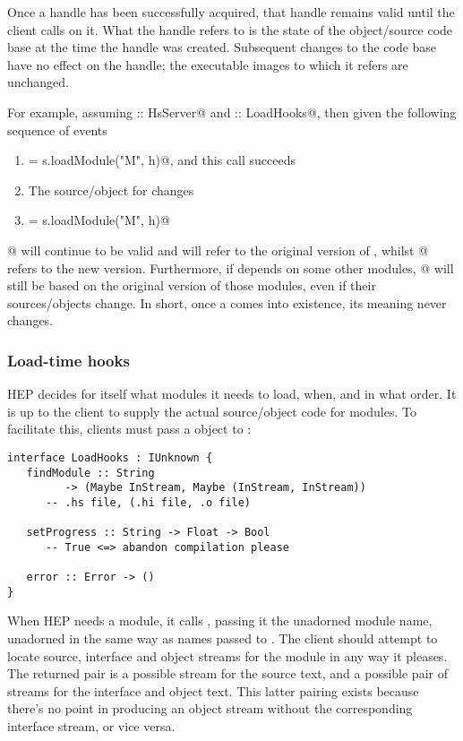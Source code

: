 Once a \verb@HsModule@ handle has been successfully acquired,
that handle remains valid until the client calls \verb@release@
on it.  What the handle refers to is the state of the object/source
code base at the time the handle was created.  Subsequent changes
to the code base have no effect on the handle; the executable images
to which it refers are unchanged.

For example, assuming \verb@s :: HsServer@ and \verb@h :: LoadHooks@,
then given the following sequence of events
\begin{enumerate}
\item {} = s.loadModule("M", h)@, and this call succeeds
\item The source/object for \verb@M@ changes
\item {} = s.loadModule("M", h)@
\end{enumerate}
@ will continue to be valid and will refer to the original
version of \verb@M@, whilst @ refers to the new version.
Furthermore, if \verb@M@ depends on some other
modules, @ will still be based on the
original version of those modules, even if their sources/objects
change.  In short, once a \verb@HsModule@ comes into existence,
its meaning never changes.

\subsubsection{Load-time hooks}

HEP decides for itself what modules it needs to load, when, and
in what order.  It is up to the client to supply the
actual source/object code for modules.  To facilitate this, 
clients must pass a \verb@LoadHooks@ object to \verb@loadModule@:
\begin{verbatim}
interface LoadHooks : IUnknown {
   findModule :: String
         -> (Maybe InStream, Maybe (InStream, InStream))
      -- .hs file, (.hi file, .o file)

   setProgress :: String -> Float -> Bool   
      -- True <=> abandon compilation please

   error :: Error -> ()
}
\end{verbatim}
When HEP needs a module, it calls \verb@findModule@, passing it
the unadorned module name, unadorned in the same way as names 
passed to \verb@loadModule@.  The client should attempt to locate
source, interface and object streams for the module in any way
it pleases.  The returned pair is a possible stream for the
source text, and a possible pair of streams for the interface
and object text.  This latter pairing exists because there's
no point in producing an object stream without the corresponding
interface stream, or vice versa.

